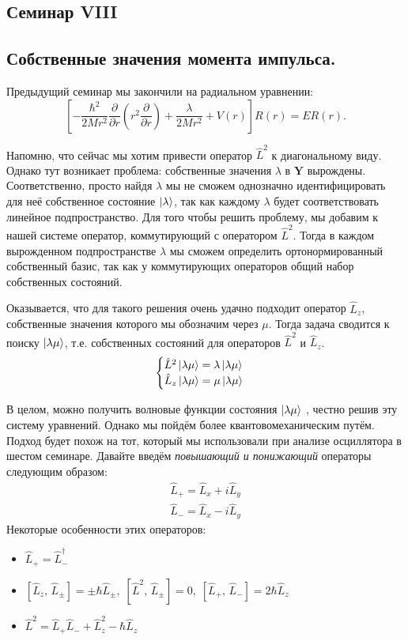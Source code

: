 \begin{center}
    \section{Семинар VIII}
\end{center}
\subsection{Собственные значения момента импульса.}
\hspace{1em} Предыдущий семинар мы закончили на радиальном уравнении:
\[
\left[-\frac{\hbar^2}{2Mr^2}\frac{\partial}{\partial r}\left( r^2 \frac{\partial}{\partial r}\right)  + \frac{\lambda}{2Mr^2} + V(r)\right]R(r) = ER(r).
\]

Напомню, что сейчас мы хотим привести оператор $\hat{L}^2$ к диагональному виду. Однако тут возникает проблема: собственные значения $\lambda$ в $\mathbf{Y}$ вырождены. Соответственно, просто найдя $\lambda$ мы не сможем однозначно идентифицировать для неё собственное состояние $\ket{\lambda}$, так как каждому $\lambda$ будет соответствовать линейное подпространство. Для того чтобы решить проблему, мы добавим к нашей системе оператор, коммутирующий с оператором $\hat{L}^2$. Тогда в каждом вырожденном подпространстве $\lambda$ мы сможем определить ортонормированный собственный базис, так как у коммутирующих операторов общий набор собственных состояний. 

Оказывается, что для такого решения очень удачно подходит оператор $\hat{L}_z$, собственные значения которого мы обозначим через $\mu$. Тогда задача сводится к поиску $\ket{\lambda\mu}$, т.е. собственных состояний для операторов $\hat{L}^2$ и $\hat{L}_z$.
\[
    \begin{cases}
        \hat{L}^2\ket{\lambda\mu} = \lambda\ket{\lambda\mu}\\
        \hat{L}_z\ket{\lambda\mu} = \mu\ket{\lambda\mu}
    \end{cases}
\]

В целом, можно получить волновые функции состояния $\ket{\lambda\mu}$ , честно решив эту систему уравнений. Однако мы пойдём более квантовомеханическим путём. Подход будет похож на тот, который мы использовали при анализе осциллятора в шестом семинаре. Давайте введём \textit{повышающий и понижающий} операторы следующим образом:
\begin{equation*}
    \begin{split}
        \hat{L}_+ = \hat{L}_x + i\hat{L}_y  \\
        \hat{L}_- = \hat{L}_x - i\hat{L}_y 
    \end{split}
\end{equation*}
Некоторые особенности этих операторов:
\begin{itemize}
    \item $\hat{L}_+ = \hat{L}^{\dagger}_-$
    \item $[\hat{L}_z, \, \hat{L}_{\pm}] = \pm\hbar \hat{L}_{\pm},\; [\hat{L}^2, \, \hat{L}_{\pm}] = 0, \; [\hat{L}_+, \, \hat{L}_- ] = 2\hbar \hat{L}_z $
    \item $\hat{L}^2 = \hat{L}_+\hat{L}_- + \hat{L}^2_z - \hbar\hat{L}_z$
\end{itemize}

